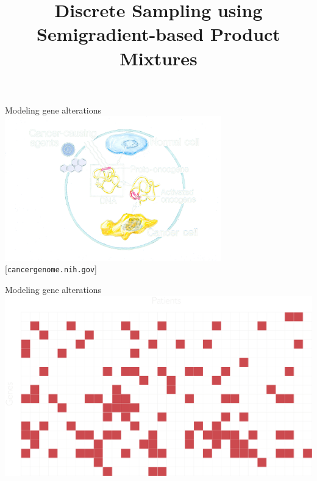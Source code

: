 \documentclass[mathserif]{beamer}
\title[Discrete Sampling using Semigradient-based Product Mixtures]
{Discrete Sampling using Semigradient-based Product Mixtures}
\author[Alkis Gotovos]{}
\newcommand{\qsource}[1]{%
{\color{col1}\tiny\hfill[#1]}
}
\begin{document}


\begin{frame}{Modeling gene alterations}
\includegraphics[width=3.7in]{figures/oncogene.png}\\
\qsource{\texttt{cancergenome.nih.gov}}
\end{frame}

\begin{frame}{Modeling gene alterations}
\centering
\includegraphics[width=\textwidth]{figures/grid_genes.pdf}
\end{frame}
\end{document}
